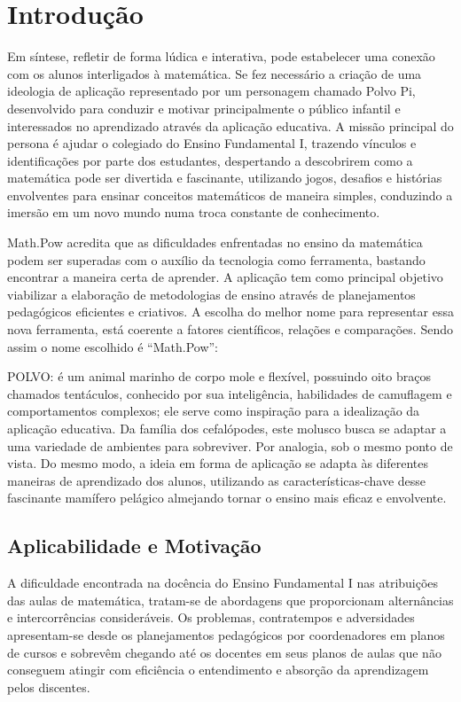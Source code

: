\chapter{Introdução}\label{chp:intro}

Em síntese, refletir de forma lúdica e interativa, pode estabelecer uma conexão com os alunos interligados à matemática. Se fez necessário a criação de uma ideologia de  aplicação representado por um personagem chamado Polvo Pi, desenvolvido para conduzir e motivar principalmente o público infantil e interessados no aprendizado através da aplicação educativa. A missão principal do persona é ajudar o colegiado do Ensino Fundamental I, trazendo vínculos e identificações por parte dos estudantes, despertando a descobrirem como a matemática pode ser divertida e fascinante, utilizando jogos, desafios e histórias envolventes para ensinar conceitos matemáticos de maneira simples, conduzindo a imersão em um novo mundo numa troca constante de conhecimento. \cite{Lopes2020}

Math.Pow acredita que as dificuldades enfrentadas no ensino da matemática podem ser superadas com o auxílio da tecnologia como ferramenta, bastando encontrar a maneira certa de aprender. A aplicação tem como principal objetivo viabilizar a elaboração de metodologias de ensino através de planejamentos pedagógicos eficientes e criativos. A escolha do melhor nome para representar essa nova ferramenta, está coerente a fatores científicos, relações e comparações. Sendo assim o nome escolhido é “Math.Pow”:

POLVO: é um animal marinho de corpo mole e flexível, possuindo oito braços chamados tentáculos, conhecido por sua inteligência, habilidades de camuflagem e comportamentos complexos; ele serve como inspiração para a idealização da aplicação educativa. Da família dos cefalópodes, este molusco busca se adaptar a uma variedade de ambientes para sobreviver. Por analogia, sob o mesmo ponto de vista. Do mesmo modo, a ideia em forma de aplicação se adapta às diferentes maneiras de aprendizado dos alunos, utilizando as características-chave desse fascinante mamífero pelágico almejando tornar o ensino mais eficaz e envolvente.\cite{BBC2023}




\section{Aplicabilidade e Motivação}\label{chp:aplic}

A dificuldade encontrada na docência do Ensino Fundamental I nas atribuições das aulas de matemática, tratam-se de abordagens que proporcionam alternâncias e intercorrências consideráveis. Os problemas, contratempos e adversidades apresentam-se desde os planejamentos pedagógicos por coordenadores em planos de cursos e sobrevêm chegando até os docentes em seus planos de aulas que não conseguem atingir com eficiência o entendimento e absorção da aprendizagem pelos discentes. 

